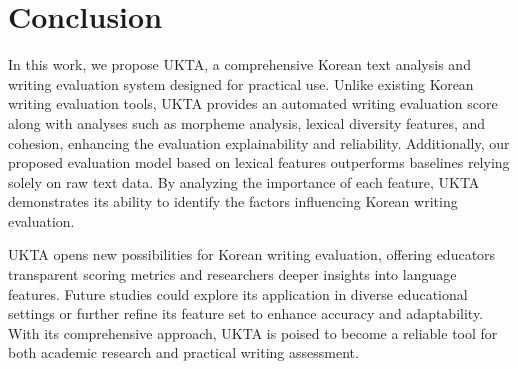 \section{Conclusion}
\label{sec:06_conclusion}

In this work, we propose \textsf{UKTA}, a comprehensive Korean text analysis and writing evaluation system designed for practical use. Unlike existing Korean writing evaluation tools, \textsf{UKTA} provides an automated writing evaluation score along with analyses such as morpheme analysis, lexical diversity features, and cohesion, enhancing the evaluation explainability and reliability. Additionally, our proposed evaluation model based on lexical features outperforms baselines relying solely on raw text data. By analyzing the importance of each feature, \textsf{UKTA} demonstrates its ability to identify the factors influencing Korean writing evaluation.

\textsf{UKTA} opens new possibilities for Korean writing evaluation, offering educators transparent scoring metrics and researchers deeper insights into language features. Future studies could explore its application in diverse educational settings or further refine its feature set to enhance accuracy and adaptability. With its comprehensive approach, \textsf{UKTA} is poised to become a reliable tool for both academic research and practical writing assessment.

